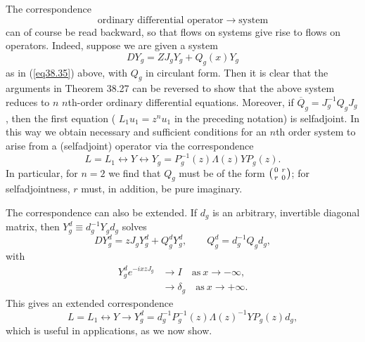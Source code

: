 \documentclass{surv-l}
\theoremstyle{plain}
\theoremstyle{definition}
\numberwithin{equation}{chapter}
\begin{document}
The correspondence
\begin{equation*}
\text{ordinary differential operator} \rightarrow \mathrm{system}
\end{equation*}
can of course be read backward, so that flows on systems give rise to flows on operators. Indeed, suppose we are given a system
\begin{equation*}
DY_{g}=ZJ_{g}Y_{g}+Q_{g}(x)Y_{g}
\end{equation*}
as in (\ref{eq38.35}) above, with $Q_{g}$ in circulant form. Then it is clear that the arguments in Theorem 38.27 can be reversed to show that the above system reduces to $n$ $n$th-order ordinary differential equations. Moreover, if $\overline{Q}_{g}=J_{g}^{-1}Q_{g}J_{g}$, then the first equation ( $L_{1}u_{1}=z^{n}u_{1}$ in the preceding notation) is selfadjoint. In this way we obtain necessary and sufficient conditions for an $n$th order system to arise from a (selfadjoint) operator via the correspondence
\begin{equation*}
L=L_{1}\longleftrightarrow Y\longleftrightarrow Y_{g}=P_{g}^{-1}(z)\Lambda(z)YP_{g}(z).
\end{equation*}
In particular, for $n=2$ we find that $Q_{g}$ must be of the form $\left({0 \ r\atop r \ 0}\right)$; for selfadjointness, $r$ must, in addition, be pure imaginary.

The correspondence can also be extended. If $d_{g}$ is an arbitrary, invertible diagonal matrix, then $Y_{g}^{d}\equiv d_{g}^{-1}Y_{g}d_{g}$ solves
\begin{equation*}
DY_{g}^{d}=zJ_{g}Y_{g}^{d}+Q_{g}^{d}Y_{g}^{d},\qquad Q_{g}^{d}=d_{g}^{-1}Q_{g}d_{g},
\end{equation*}
with
\begin{align*}
Y_{g}^{d}e^{-ixzJ_{g}}&\rightarrow I\quad \mathrm{as}\  x\rightarrow-\infty,\\
&\rightarrow\delta_{g}\quad \mathrm{as}\  x\rightarrow+\infty.
\end{align*}
This gives an extended correspondence
\begin{equation*}
L=L_{1}\longleftrightarrow Y\rightarrow Y_{g}^{d}=d_{g}^{-1}P_{g}^{-1}(z)\Lambda(z)^{-1}YP_{g}(z)d_{g},
\end{equation*}
which is useful in applications, as we now show.
\end{document}
